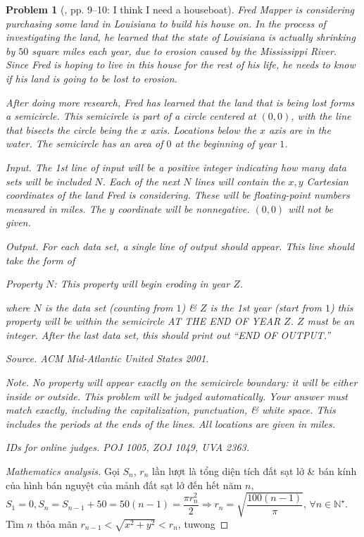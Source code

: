 \documentclass{article}
\newtheorem{problem}{Problem}
\begin{document}
\begin{problem}[\cite{Wu_Wang2016}, pp. 9--10: I think I need a houseboat]
	{\sc Fred Mapper} is considering purchasing some land in Louisiana to build his house on. In the process of investigating the land, he learned that the state of Louisiana is actually shrinking by $50$ square miles each year, due to erosion caused by the Mississippi River. Since {\sc Fred} is hoping to live in this house for the rest of his life, he needs to know if his land is going to be lost to erosion.
	
	After doing more research, {\sc Fred} has learned that the land that is being lost forms a semicircle. This semicircle is part of a circle centered at $(0,0)$, with the line that bisects the circle being the $x$ axis. Locations below the $x$ axis are in the water. The semicircle has an area of $0$ at the beginning of year $1$.
	\item {\sf Input.} The 1st line of input will be a positive integer indicating how many data sets will be included $N$. Each of the next $N$ lines will contain the $x,y$ Cartesian coordinates of the land {\sc Fred} is considering. These will be floating-point numbers measured in miles. The $y$ coordinate will be nonnegative. $(0,0)$ will not be given.
	\item {\sf Output.} For each data set, a single line of output should appear. This line should take the form of
	\begin{center}
		Property $N$: This property will begin eroding in year $Z$.
	\end{center}
	where $N$ is the data set (counting from $1$) \& $Z$ is the 1st year (start from $1$) this property will be within the semicircle AT THE END OF YEAR $Z$. $Z$ must be an integer. After the last data set, this should print out ``END OF OUTPUT.''
	\item {\sf Source.} ACM Mid-Atlantic United States 2001.
	\item {\sf Note.} No property will appear exactly on the semicircle boundary: it will be either inside or outside. This problem will be judged automatically. Your answer must match exactly, including the capitalization, punctuation, \& white space. This includes the periods at the ends of the lines. All locations are given in miles.
	\item {\sf IDs for online judges.} POJ 1005, ZOJ 1049, UVA 2363.
\end{problem}

\begin{proof}[Mathematics analysis]
	Gọi $S_n$, $r_n$ lần lượt là tổng diện tích đất sạt lở \& bán kính của hình bán nguyệt của mảnh đất sạt lở đến hết năm $n$, $S_1 = 0,S_n = S_{n-1} + 50 = 50(n - 1) = \dfrac{\pi r_n^2}{2}\Rightarrow r_n = \sqrt{\dfrac{100(n - 1)}{\pi}}$, $\forall n\in\mathbb{N}^\star$. Tìm $n$ thỏa mãn $r_{n-1} < \sqrt{x^2 + y^2} < r_n$, tuwong 
\end{proof}
\end{document}
